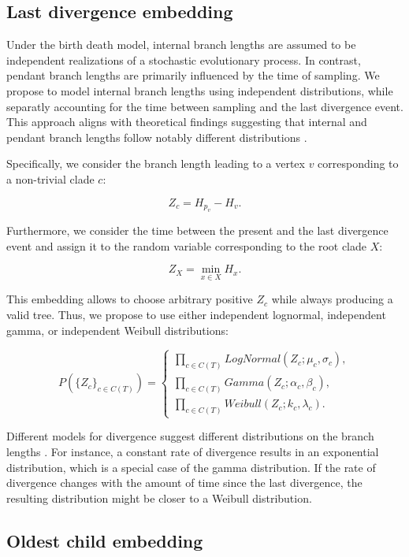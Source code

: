 \documentclass[10pt,letterpaper]{article}
\begin{document}
\subsection*{Last divergence embedding}

Under the birth death model, internal branch lengths are assumed to be independent realizations of a stochastic evolutionary process. In contrast, pendant branch lengths are primarily influenced by the time of sampling. We propose to model internal branch lengths using independent distributions, while separatly accounting for the time between sampling and the last divergence event. This approach aligns with theoretical findings suggesting that internal and pendant branch lengths follow notably different distributions \cite{birthdeathdistribution,birthdeathdistributionstadler}.

Specifically, we consider the branch length leading to a vertex $v$ corresponding to a non-trivial clade $c$:

$$
Z_c = H_{p_v} - H_v.
$$

Furthermore, we consider the time between the present and the last divergence event and assign it to the random variable corresponding to the root clade $X$:

$$
Z_X = \min_{x \in X}{H_x}.
$$

This embedding allows to choose arbitrary positive $Z_c$ while always producing a valid tree. Thus, we propose to use either independent lognormal, independent gamma, or independent Weibull distributions:

$$
P(\{Z_c\}_{c \in C(T)}) = \begin{cases}
	\prod_{c \in C(T)}{LogNormal(Z_c; \mu_c, \sigma_c)}, \\
	\prod_{c \in C(T)}{Gamma(Z_c; \alpha_c, \beta_c)}, \\
	\prod_{c \in C(T)}{Weibull(Z_c; k_c, \lambda_c)}.
\end{cases}
$$

Different models for divergence suggest different distributions on the branch lengths \cite{venditti2010phylogenies}. For instance, a constant rate of divergence results in an exponential distribution, which is a special case of the gamma distribution. If the rate of divergence changes with the amount of time since the last divergence, the resulting distribution might be closer to a Weibull distribution.

\subsection*{Oldest child embedding}
\end{document}
